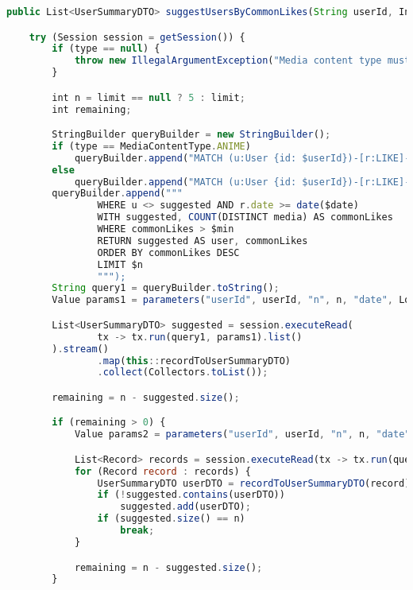 \begin{lstlisting}[language=JavaScript]
public List<UserSummaryDTO> suggestUsersByCommonLikes(String userId, Integer limit, MediaContentType type) throws DAOException {

    try (Session session = getSession()) {
        if (type == null) {
            throw new IllegalArgumentException("Media content type must be specified");
        }

        int n = limit == null ? 5 : limit;
        int remaining;

        StringBuilder queryBuilder = new StringBuilder();
        if (type == MediaContentType.ANIME)
            queryBuilder.append("MATCH (u:User {id: $userId})-[r:LIKE]->(media:Anime)<-[:LIKE]-(suggested:User) ");
        else
            queryBuilder.append("MATCH (u:User {id: $userId})-[r:LIKE]->(media:Manga)<-[:LIKE]-(suggested:User) ");
        queryBuilder.append("""
                WHERE u <> suggested AND r.date >= date($date)
                WITH suggested, COUNT(DISTINCT media) AS commonLikes
                WHERE commonLikes > $min
                RETURN suggested AS user, commonLikes
                ORDER BY commonLikes DESC
                LIMIT $n
                """);
        String query1 = queryBuilder.toString();
        Value params1 = parameters("userId", userId, "n", n, "date", LocalDate.now().minusMonths(6), "min", 5);

        List<UserSummaryDTO> suggested = session.executeRead(
                tx -> tx.run(query1, params1).list()
        ).stream()
                .map(this::recordToUserSummaryDTO)
                .collect(Collectors.toList());

        remaining = n - suggested.size();

        if (remaining > 0) {
            Value params2 = parameters("userId", userId, "n", n, "date", LocalDate.now().minusYears(1), "min", 5);

            List<Record> records = session.executeRead(tx -> tx.run(query1, params2).list());
            for (Record record : records) {
                UserSummaryDTO userDTO = recordToUserSummaryDTO(record);
                if (!suggested.contains(userDTO))
                    suggested.add(userDTO);
                if (suggested.size() == n)
                    break;
            }

            remaining = n - suggested.size();
        }


\end{lstlisting}
